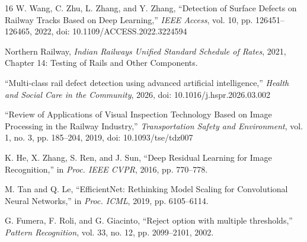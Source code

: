\documentclass[conference]{IEEE}
\begin{document}
\begin{thebibliography}{16}
W. Wang, C. Zhu, L. Zhang, and Y. Zhang, ``Detection of Surface Defects on Railway Tracks Based on Deep Learning,'' \textit{IEEE Access}, vol. 10, pp. 126451--126465, 2022, doi: 10.1109/ACCESS.2022.3224594

Northern Railway, \textit{Indian Railways Unified Standard Schedule of Rates}, 2021, Chapter 14: Testing of Rails and Other Components.

``Multi-class rail defect detection using advanced artificial intelligence,'' \textit{Health and Social Care in the Community}, 2026, doi: 10.1016/j.hspr.2026.03.002

``Review of Applications of Visual Inspection Technology Based on Image Processing in the Railway Industry,'' \textit{Transportation Safety and Environment}, vol. 1, no. 3, pp. 185--204, 2019, doi: 10.1093/tse/tdz007

K. He, X. Zhang, S. Ren, and J. Sun, ``Deep Residual Learning for Image Recognition,'' in \textit{Proc. IEEE CVPR}, 2016, pp. 770--778.

M. Tan and Q. Le, ``EfficientNet: Rethinking Model Scaling for Convolutional Neural Networks,'' in \textit{Proc. ICML}, 2019, pp. 6105--6114.

G. Fumera, F. Roli, and G. Giacinto, ``Reject option with multiple thresholds,'' \textit{Pattern Recognition}, vol. 33, no. 12, pp. 2099--2101, 2002.

\end{thebibliography}
\end{document}
